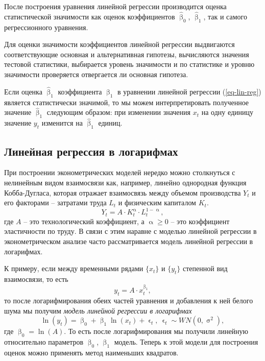 \documentclass[a4paper, 14pt]{extreport}
\numberwithin{equation}{section}
\renewcommand{\geq}{\geqslant}
\renewcommand{\alpha}{\upalpha}
\renewcommand{\beta}{\upbeta}
\renewcommand{\epsilon}{\upvarepsilon}
\renewcommand{\sigma}{\upsigma}
\numberwithin{equation}{section}
\begin{document}
	После построения уравнения линейной регрессии производится оценка статистической значимости как оценок коэффициентов $\hat \beta_0$, $\hat \beta_1$, так и самого регрессионного уравнения. 
	
	Для оценки значимости коэффициентов линейной регрессии выдвигаются соответствующие основная и альтернативная гипотезы, вычисляются значения тестовой статистики, выбирается уровень значимости и по статистике и уровню значимости проверяется отвергается ли основная гипотеза.

	Если оценка $\hat \beta_1$ коэффициента $\beta_1$ в уравнении линейной регрессии (\ref{eq-lin-reg}) является статистически значимой, то мы можем интерпретировать полученное значение $\hat \beta_1$ следующим образом: при изменении значения $x_t$ на одну единицу значение $y_t$ изменится на $\hat \beta_1$ единиц.
	
	\subsection{Линейная регрессия в логарифмах}
	
	При построении эконометрических моделей нередко можно столкнуться с нелинейным видом взаимосвязи как, например, линейно однородная функция Кобба-Дугласа, которая отражает взаимосвязь между объемом производства $Y_t$ и его факторами -- затратами труда $L_t$ и физическим капиталом $K_t$.
	\begin{equation}
		Y_t = A\cdot K_t^\alpha \cdot L_t^{1-\alpha}, 
	\end{equation}
	где $A$ -- это технологический коэффициент, а $\alpha\geq 0$ -- это коэффициент эластичности по труду.
	В связи с этим наравне с моделью линейной регрессии в эконометрическом анализе часто рассматривается модель линейной регрессии в логарифмах.
	
	К примеру, если между временными рядами $\{x_t\}$ и $\{y_t\}$ степенной вид взаимосвязи, то есть
	\begin{equation}
		y_t = A\cdot x_t^{\beta_1},
	\end{equation}
	то после логарифмирования обеих частей уравнения и добавления к ней белого шума мы получим \textit{модель линейной регрессии в логарифмах}
	\begin{equation}
		\ln (y_t) = \beta_0 + \beta_1 \ln (x_t) + \epsilon_t,\ \epsilon_t \sim WN(0,\sigma^2),
	\end{equation}
	где $\beta_0 = \ln (A)$. То есть после логарифмирования мы получили линейную относительно параметров $\beta_0$, $\beta_1$ модель. Теперь к этой модели для построения оценок можно применять метод наименьших квадратов. 
	
\end{document}
